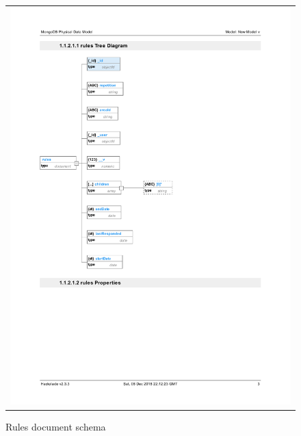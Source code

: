 \documentclass{sprawozdanie-agh}
\begin{document}
		\begin{figure}[H] 
			\centering
			\begin{tabular}{c}
				\includegraphics[width=.70\textwidth]{rulesDB}
			\end{tabular} 
			\caption{Rules document schema}
		\end{figure}
\end{document}
